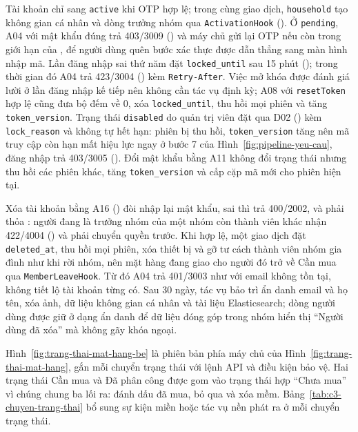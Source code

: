 
Tài khoản chỉ sang \texttt{active} khi OTP hợp lệ; trong cùng giao dịch, \texttt{household} tạo không gian cá nhân và dòng trưởng nhóm qua \texttt{ActivationHook} (). Ở \texttt{pending}, A04 với mật khẩu đúng trả 403/3009 () và máy chủ gửi lại OTP nếu còn trong giới hạn của , để người dùng quên bước xác thực được dẫn thẳng sang màn hình nhập mã. Lần đăng nhập sai thứ năm đặt \texttt{locked\_until} sau 15 phút (); trong thời gian đó A04 trả 423/3004 () kèm \texttt{Retry-After}. Việc mở khóa được đánh giá lười ở lần đăng nhập kế tiếp nên không cần tác vụ định kỳ; A08 với \texttt{resetToken} hợp lệ cũng đưa bộ đếm về 0, xóa \texttt{locked\_until}, thu hồi mọi phiên và tăng \texttt{token\_version}. Trạng thái \texttt{disabled} do quản trị viên đặt qua D02 () kèm \texttt{lock\_reason} và không tự hết hạn: phiên bị thu hồi, \texttt{token\_version} tăng nên mã truy cập còn hạn mất hiệu lực ngay ở bước 7 của Hình~\ref{fig:pipeline-yeu-cau}, đăng nhập trả 403/3005 (). Đổi mật khẩu bằng A11 không đổi trạng thái nhưng thu hồi các phiên khác, tăng \texttt{token\_version} và cấp cặp mã mới cho phiên hiện tại.

Xóa tài khoản bằng A16 () đòi nhập lại mật khẩu, sai thì trả 400/2002, và phải thỏa : người đang là trưởng nhóm của một nhóm còn thành viên khác nhận 422/4004 () và phải chuyển quyền trước. Khi hợp lệ, một giao dịch đặt \texttt{deleted\_at}, thu hồi mọi phiên, xóa thiết bị và gỡ tư cách thành viên nhóm gia đình như khi rời nhóm, nên mặt hàng đang giao cho người đó trở về Cần mua qua \texttt{MemberLeaveHook}. Từ đó A04 trả 401/3003 như với email không tồn tại, không tiết lộ tài khoản từng có. Sau 30 ngày, tác vụ bảo trì ẩn danh email và họ tên, xóa ảnh, dữ liệu không gian cá nhân và tài liệu Elasticsearch; dòng người dùng được giữ ở dạng ẩn danh để dữ liệu đóng góp trong nhóm hiển thị “Người dùng đã xóa” mà không gãy khóa ngoại.

Hình~\ref{fig:trang-thai-mat-hang-be} là phiên bản phía máy chủ của Hình~\ref{fig:trang-thai-mat-hang}, gắn mỗi chuyển trạng thái với lệnh API và điều kiện bảo vệ. Hai trạng thái Cần mua và Đã phân công được gom vào trạng thái hợp “Chưa mua” vì chúng chung ba lối ra: đánh dấu đã mua, bỏ qua và xóa mềm. Bảng~\ref{tab:c3-chuyen-trang-thai} bổ sung sự kiện miền hoặc tác vụ nền phát ra ở mỗi chuyển trạng thái.

